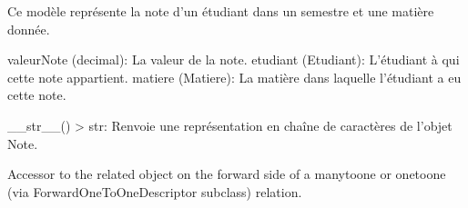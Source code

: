 \documentclass[letterpaper,10pt,french]{sphinxmanual}
\begin{document}

\begin{fulllineitems}
\label{\detokenize{main/model:main.models.Note}}
\pysigstartsignatures
{}
\pysigstopsignatures
\sphinxAtStartPar
Ce modèle représente la note d’un étudiant dans un semestre et une matière donnée.
\begin{description}
\sphinxAtStartPar
valeurNote (decimal): La valeur de la note.
etudiant (Etudiant): L’étudiant à qui cette note appartient.
matiere (Matiere): La matière dans laquelle l’étudiant a eu cette note.

\sphinxAtStartPar
\_\_str\_\_() \sphinxhyphen{}\textgreater{} str: Renvoie une représentation en chaîne de caractères de l’objet Note.

\end{description}

\begin{fulllineitems}
\label{\detokenize{main/model:main.models.Note.DoesNotExist}}
\pysigstartsignatures
{}
\pysigstopsignatures
\end{fulllineitems}


\begin{fulllineitems}
\label{\detokenize{main/model:main.models.Note.MultipleObjectsReturned}}
\pysigstartsignatures
{}
\pysigstopsignatures
\end{fulllineitems}


\begin{fulllineitems}
\label{\detokenize{main/model:main.models.Note.etudiant}}
\pysigstartsignatures
{}
\pysigstopsignatures
\sphinxAtStartPar
Accessor to the related object on the forward side of a many\sphinxhyphen{}to\sphinxhyphen{}one or
one\sphinxhyphen{}to\sphinxhyphen{}one (via ForwardOneToOneDescriptor subclass) relation.


\end{fulllineitems}
\end{fulllineitems}
\end{document}
